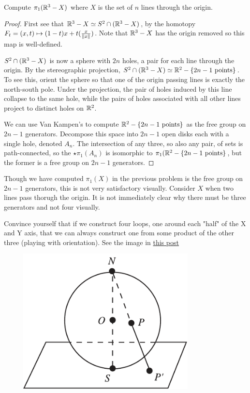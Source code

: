 \documentclass[10pt]{article}
\begin{document}
\begin{exercise}[1.2.4]
	Compute $\pi_1(\mathbb{R}^3 - X)$ where $X$ is the set of $n$ lines through the origin.
\end{exercise}
\begin{proof}
	First see that $\mathbb{R}^3 - X \simeq S^2 \cap (\mathbb{R}^3 - X)$, by the homotopy
	$F_t = (x, t) \mapsto (1-t)x + t(\frac{x}{\left\lVert x\right\rVert})$. Note that $\mathbb{R}^3 - X$
	has the origin removed so this map is well-defined.

	$S^2 \cap (\mathbb{R}^3 - X)$ is now a sphere with $2n$ holes, a pair for each
	line through the origin. By the stereographic
	projection, $S^2 \cap (\mathbb{R}^3 - X) \simeq \mathbb{R}^2 - \{2n-1 \text{ points}\}$. To
	see this, orient the sphere so that one of the origin passing lines is
	exactly the north-south pole. Under the projection, the pair of holes induced
	by this line collapse to the same hole, while the pairs of holes associated
	with all other lines project to distinct holes on $\mathbb{R}^2$.

	We can use Van Kampen's to compute $\mathbb{R}^2 - \{2n-1 \text{ points}\}$ as the
	free group on $2n-1$ generators. Decompose this space into $2n-1$ open disks
	each with a single hole, denoted $A_n$. The intersection of any three, so also any pair, of
	sets is path-connected, so the $\star \pi_1(A_n)$ is isomorphic to $\pi_1(\mathbb{R}^2
	- \{2n-1 \text{ points}\}$, but the former is a free group on $2n-1$
	generators.
\end{proof}

\begin{note}
Though we have computed $\pi_1(X)$ in the previous problem is the free group on
$2n-1$ generators, this is not very satisfactory visually. Consider $X$ when
two lines pass thorugh the origin. It is not immediately clear why there must
be three generators and not four visually.

Convince yourself that if we construct four loops, one around each "half" of
the X and Y axis, that we can always construct one from some product of the
other three (playing with orientation). See the image in \href{https://math.stackexchange.com/questions/1427953/regarding-an-exercise-of-hatcher-fundamental-group-of-mathbbr3-with-n-l}{this post}
\end{note}

\begin{figure}[ht!]
\centering
\includegraphics[width=90mm]{./algebraic_relationship_stereo.pdf}
\caption{}
\end{figure}
\end{document}
